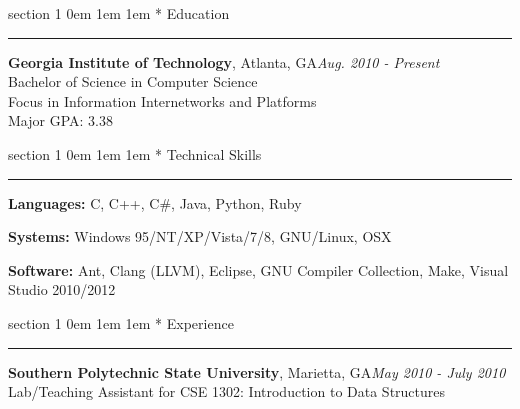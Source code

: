 \documentclass{article}
\makeatletter
\newcommand{\name}[1]{\def \@name {#1}}
\newcommand{\streetaddress}[1]{\def \@streetaddress {#1}}
\newcommand{\citystatezip}[1]{\def \@citystatezip {#1}}
\newcommand{\phone}[1]{\def \@phone {#1}}
\newcommand{\email}[1]{\def \@email {#1}}
\newcommand{\website}[1]{\def \@website {#1}}
\renewcommand{\section}[1]{
	\vspace{0.75em} %
	\@startsection
		{section}
		{1}
		{\z@}
		{0em}
		{1em \@minus 1em} %
		{\normalfont\large\sc\bfseries}
		*
		{#1}
	\vspace{-0.75em} %
	\hrule
	\vspace{0.25em} %
	\par
}
\newcommand{\entry}[1]{\def \@entry {#1}}
\newcommand{\dates}[1]{\def \@dates {#1}}
\newcommand{\location}[1]{\def \@location {#1}}
\newenvironment{locationentry}{
		\vspace{0.5em} %
		{\bf \@entry}, \@location \hfill {\it \@dates} \\
	}{}
\makeatother
\begin{document}
\name{Robert Kernan}
\phone{(770) 355-4050}
\streetaddress{16 Arbor Way Drive}
\citystatezip{Decatur, GA 30030}
\email{rkernan@gmail.com}
\website{robertkernan.com}

\maketitle

\thispagestyle{empty}

%
%

\section{Education}
\entry{Georgia Institute of Technology}
\location{Atlanta, GA}
\dates{Aug. 2010 - Present}
\begin{locationentry}
Bachelor of Science in Computer Science \\
Focus in Information Internetworks and Platforms \\
Major GPA: 3.38 \\
\par
\end{locationentry}

\section{Technical Skills}
\vspace{0.5em}
{\bf Languages:}
C, C++, C\#, Java, Python, Ruby

\vspace{0.25em}
{\bf Systems:}
Windows 95/NT/XP/Vista/7/8, GNU/Linux, OSX

\vspace{0.25em}
{\bf Software:}
Ant, Clang (LLVM), Eclipse, GNU Compiler Collection, Make, Visual Studio 2010/2012

\section{Experience}
\entry{Southern Polytechnic State University}
\location{Marietta, GA}
\dates{May 2010 - July 2010}
\begin{locationentry}
 Lab/Teaching Assistant for CSE 1302: Introduction to Data Structures
\end{locationentry}
\end{document}
